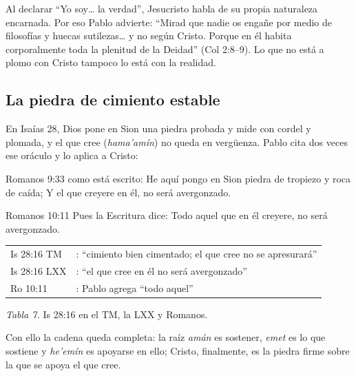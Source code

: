 Al declarar ``Yo soy\ldots{} la verdad'', Jesucristo habla de su propia naturaleza encarnada. Por eso Pablo advierte: ``Mirad que nadie os engañe por medio de filosofías y huecas sutilezas\ldots{} y no según Cristo. Porque en él habita corporalmente toda la plenitud de la Deidad'' (Col 2:8--9). Lo que no está a plomo con Cristo tampoco lo está con la realidad.


\subsection{La piedra de cimiento estable}\label{sec:piedra}
En Isaías 28, Dios pone en Sion una piedra probada y mide con cordel y plomada, y el que cree (\emph{hama'amín}) no queda en vergüenza. Pablo cita dos veces ese oráculo y lo aplica a Cristo:

\begin{verso}{Romanos 9:33}
como está escrito: He aquí pongo en Sion piedra de tropiezo y roca de caída; Y el que creyere en él, no será avergonzado.
\end{verso}
\begin{verso}{Romanos 10:11}
Pues la Escritura dice: Todo aquel que en él creyere, no será avergonzado.
\end{verso}

\begin{center}\small\renewcommand{\arraystretch}{1.2}
\begin{tabular}{@{}L{2.4cm}L{12.0cm}@{}}
\toprule
Is 28:16 TM & : ``cimiento bien cimentado; el que cree no se apresurará'' \\
Is 28:16 LXX & : ``el que cree en él no será avergonzado'' \\
Ro 10:11 & : Pablo agrega ``todo aquel'' \\
\bottomrule
\end{tabular}\par
{\footnotesize\color{gris}\textit{Tabla 7.} Is 28:16 en el TM, la LXX y Romanos.}
\end{center}

Con ello la cadena queda completa: la raíz \emph{amán} es sostener, \emph{emet} es lo que sostiene y \emph{he'emín} es apoyarse en ello; Cristo, finalmente, es la piedra firme sobre la que se apoya el que cree.

